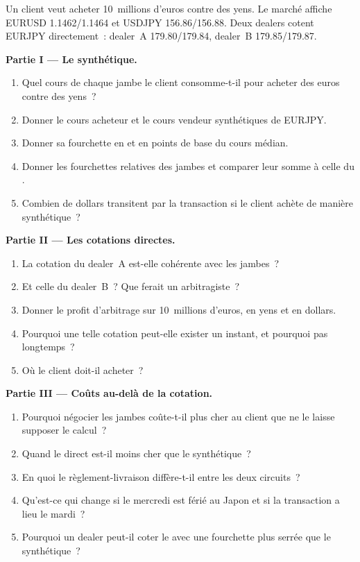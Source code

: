 \begin{problem}\label{pb:m2:the-fx-market:1}
Un client veut acheter 10~millions d'euros contre des yens. Le marché affiche EURUSD
1.1462/1.1464 et USDJPY 156.86/156.88. Deux dealers cotent EURJPY directement~:
dealer~A 179.80/179.84, dealer~B 179.85/179.87.

\medskip\noindent\textbf{Partie I --- Le  synthétique.}
\begin{enumerate}
\item Quel cours de chaque jambe le client consomme-t-il pour acheter des euros contre des yens~?
\item Donner le cours acheteur et le cours vendeur synthétiques de EURJPY.
\item Donner sa fourchette en  et en points de base du cours médian.
\item Donner les fourchettes relatives des jambes et comparer leur somme à celle du .
\item Combien de dollars transitent par la transaction si le client achète de manière synthétique~?
\end{enumerate}

\medskip\noindent\textbf{Partie II --- Les cotations directes.}
\begin{enumerate}[resume]
\item La cotation du dealer~A est-elle cohérente avec les jambes~?
\item Et celle du dealer~B~? Que ferait un arbitragiste~?
\item Donner le profit d'arbitrage sur 10~millions d'euros, en yens et en dollars.
\item Pourquoi une telle cotation peut-elle exister un instant, et pourquoi pas longtemps~?
\item Où le client doit-il acheter~?
\end{enumerate}

\medskip\noindent\textbf{Partie III --- Coûts au-delà de la cotation.}
\begin{enumerate}[resume]
\item Pourquoi négocier les jambes coûte-t-il plus cher au client que ne le laisse supposer le calcul~?
\item Quand le  direct est-il moins cher que le synthétique~?
\item En quoi le règlement-livraison diffère-t-il entre les deux circuits~?
\item Qu'est-ce qui change si le mercredi est férié au Japon et si la transaction a lieu le mardi~?
\item Pourquoi un dealer peut-il coter le  avec une fourchette plus serrée que le synthétique~?
\end{enumerate}


\end{problem}
